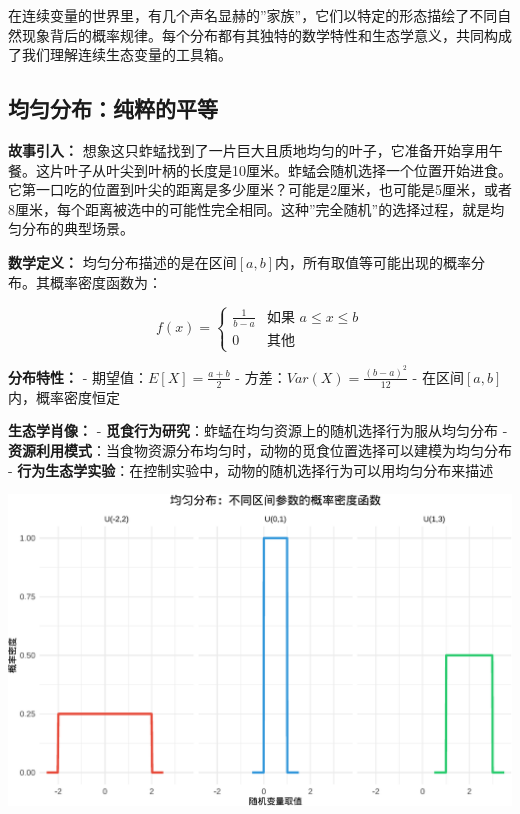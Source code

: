 \documentclass[
]{book}
\begin{document}
在连续变量的世界里，有几个声名显赫的''家族''，它们以特定的形态描绘了不同自然现象背后的概率规律。每个分布都有其独特的数学特性和生态学意义，共同构成了我们理解连续生态变量的工具箱。

\hypertarget{ux5747ux5300ux5206ux5e03ux7eafux7cb9ux7684ux5e73ux7b49}{%
\subsection{均匀分布：纯粹的平等}\label{ux5747ux5300ux5206ux5e03ux7eafux7cb9ux7684ux5e73ux7b49}}

\textbf{故事引入：} 想象这只蚱蜢找到了一片巨大且质地均匀的叶子，它准备开始享用午餐。这片叶子从叶尖到叶柄的长度是10厘米。蚱蜢会随机选择一个位置开始进食。它第一口吃的位置到叶尖的距离是多少厘米？可能是2厘米，也可能是5厘米，或者8厘米，每个距离被选中的可能性完全相同。这种''完全随机''的选择过程，就是均匀分布的典型场景。

\textbf{数学定义：} 均匀分布描述的是在区间\([a, b]\)内，所有取值等可能出现的概率分布。其概率密度函数为：

\[f(x) = \begin{cases}
\frac{1}{b-a} & \text{如果 } a \leq x \leq b \\
0 & \text{其他}
\end{cases}\]

\textbf{分布特性：}
- 期望值：\(E[X] = \frac{a+b}{2}\)
- 方差：\(Var(X) = \frac{(b-a)^2}{12}\)
- 在区间\([a, b]\)内，概率密度恒定

\textbf{生态学肖像：}
- \textbf{觅食行为研究}：蚱蜢在均匀资源上的随机选择行为服从均匀分布
- \textbf{资源利用模式}：当食物资源分布均匀时，动物的觅食位置选择可以建模为均匀分布
- \textbf{行为生态学实验}：在控制实验中，动物的随机选择行为可以用均匀分布来描述

\begin{center}\includegraphics[width=0.8\linewidth]{ecological-statistics_files/figure-latex/unnamed-chunk-27-1} \end{center}
\end{document}
